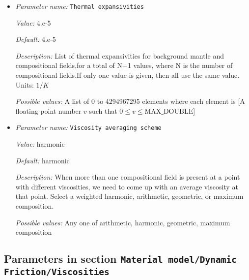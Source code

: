 \begin{itemize}
{\it Value:} 4.7


{\it Default:} 4.7


{\it Description:} List of thermal conductivities for background mantle and compositional fields,for a total of N+1 values, where N is the number of compositional fields.If only one value is given, then all use the same value. Units: $W/m/K$.


{\it Possible values:} A list of 0 to 4294967295 elements where each element is [A floating point number $v$ such that $0 \leq v \leq \text{MAX\_DOUBLE}$]
\item {\it Parameter name:} {\tt Thermal expansivities}
\label{parameters:Material model/Dynamic Friction/Thermal expansivities}


{\it Value:} 4.e-5


{\it Default:} 4.e-5


{\it Description:} List of thermal expansivities for background mantle and compositional fields,for a total of N+1 values, where N is the number of compositional fields.If only one value is given, then all use the same value. Units: $1/K$


{\it Possible values:} A list of 0 to 4294967295 elements where each element is [A floating point number $v$ such that $0 \leq v \leq \text{MAX\_DOUBLE}$]
\item {\it Parameter name:} {\tt Viscosity averaging scheme}
\label{parameters:Material model/Dynamic Friction/Viscosity averaging scheme}


{\it Value:} harmonic


{\it Default:} harmonic


{\it Description:} When more than one compositional field is present at a point with different viscosities, we need to come up with an average viscosity at that point.  Select a weighted harmonic, arithmetic, geometric, or maximum composition.


{\it Possible values:} Any one of arithmetic, harmonic, geometric, maximum composition
\end{itemize}



\subsection{Parameters in section \tt Material model/Dynamic Friction/Viscosities}
\label{parameters:Material_20model/Dynamic_20Friction/Viscosities}

